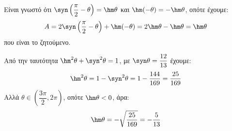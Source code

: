 \begin{alist}
\item Είναι γνωστό ότι $\syn \left(\dfrac{\pi}{2} - \theta\right) = \hm \theta$ και $\hm (-\theta) = -\hm \theta$, οπότε έχουμε:
\[A = 2\syn \left(\frac{\pi}{2} - \theta\right) + \hm (-\theta) = 2\hm \theta - \hm \theta = \hm \theta\]
που είναι το ζητούμενο.
\item Από την ταυτότητα $\hm ^2\theta + \syn ^2\theta = 1$, με $\syn \theta = \dfrac{12}{13}$ έχουμε:
\[\hm ^2\theta = 1 - \syn ^2\theta = 1 - \frac{144}{169} = \frac{25}{169}\]
Αλλά $\theta \in \left(\dfrac{3\pi}{2}, 2\pi\right)$, οπότε $\hm \theta < 0$, άρα:
\[\hm \theta = -\sqrt{\frac{25}{169}} = -\frac{5}{13}\]
\end{alist}


